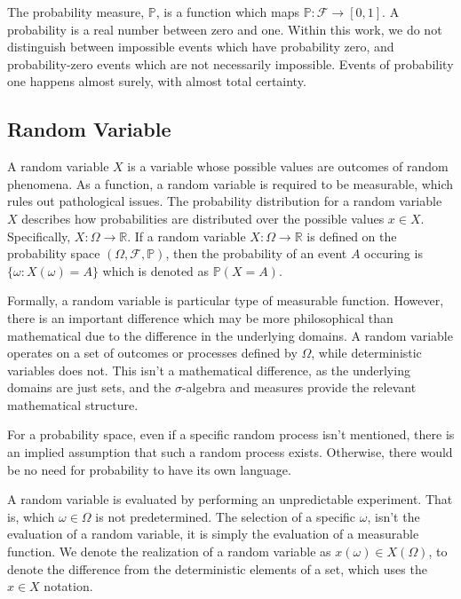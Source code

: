 The probability measure, $\mathbb{P}$, is a function which maps $\mathbb{P}:\mathcal{F}\rightarrow[0,1]$.  A probability is a real number between zero and one.  Within this work, we do not distinguish between impossible events which have probability zero, and probability-zero events which are not necessarily impossible.  Events of probability one happens almost surely, with almost total certainty.

\subsection{Random Variable}

A random variable $X$ is a variable whose possible values are outcomes of random phenomena.  As a function, a random variable is required to be measurable, which rules out pathological issues.  The probability distribution for a random variable $X$ describes how probabilities are distributed over the possible values $x \in X$.  Specifically, $X:\Omega\rightarrow\mathbb{R}$.  If a random variable $X:\Omega \rightarrow \mathbb{R}$ is defined on the probability space $(\Omega,\mathcal{F},\mathbb{P})$, then the probability of an event $A$ occuring is $\{\omega:X(\omega)=A\}$ which is denoted as $\mathbb{P}(X=A)$.

Formally, a random variable is particular type of measurable function.  However, there is an important difference which may be more philosophical than mathematical due to the difference in the underlying domains.  A random variable operates on a set of outcomes or processes defined by $\Omega$, while deterministic variables does not.  This isn't a mathematical difference, as the underlying domains are just sets, and the $\sigma$-algebra and measures provide the relevant mathematical structure.

For a probability space, even if a specific random process isn't mentioned, there is an implied assumption that such a random process exists.  Otherwise, there would be no need for probability to have its own language.

A random variable is evaluated by performing an unpredictable experiment.  That is, which $\omega \in \Omega$ is not predetermined.  The selection of a specific $\omega$, isn't the evaluation of a random variable, it is simply the evaluation of a measurable function.  We denote the realization of a random variable as $x(\omega) \in X(\Omega)$, to denote the difference from the deterministic elements of a set, which uses the $x \in X$ notation.


